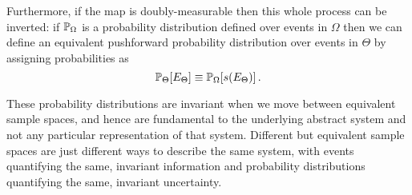Furthermore, if the map is doubly-measurable then this whole process can be 
inverted: if $\mathbb{P}_{\Omega}$ is a probability distribution defined over events in 
$\Omega$ then we can define an equivalent pushforward probability distribution 
over events in $\Theta$ by assigning probabilities as
%
\begin{equation*}
\mathbb{P}_{\Theta} \! \left[ E_{\Theta} \right]
\equiv
\mathbb{P}_{\Omega} \! \left[ s \! \left( E_{\Theta} \right) \right].
\end{equation*}

These probability distributions are invariant when we move between equivalent 
sample spaces, and hence are fundamental to the underlying abstract system 
and not any particular representation of that system.  Different but equivalent 
sample spaces are just different ways to describe the same system, with events 
quantifying the same, invariant information and probability distributions quantifying
the same, invariant uncertainty.

